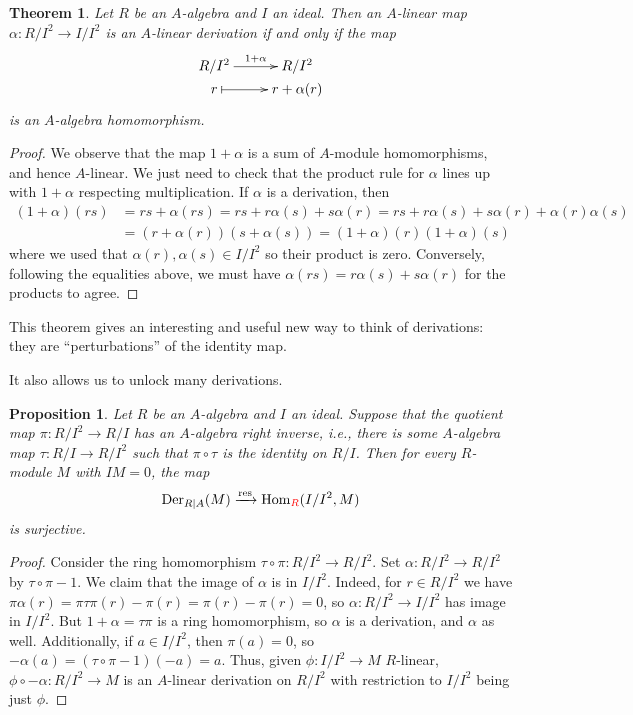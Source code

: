 \documentclass{amsart}[12pt]
\def\Der{\operatorname{Der}}
\newcommand{\Hom}{\mathrm{Hom}}
\numberwithin{equation}{section}
\theoremstyle{plain} %
\newtheorem{thm}[equation]{Theorem}
\newtheorem{prop}[equation]{Proposition}
\theoremstyle{definition}
\theoremstyle{remark}
\newcommand{\xra}[1]{\xrightarrow{#1}}
\def\res{\operatorname{res}}
\newcommand{\red}[1]{{\color{red}#1}}
\begin{document}
\begin{thm} Let $R$ be an $A$-algebra and $I$ an ideal. Then an $A$-linear map $\alpha: R/I^2 \to I/I^2$ is an $A$-linear derivation if and only if the map 
\[ \xymatrix@R=0pc{ R/I^2 \ar[r]^-{1+\alpha} &  R/I^2 \\ r \ar@{|->}[r]& r + \alpha(r) }\]
is an $A$-algebra homomorphism.
\end{thm}
\begin{proof}
We observe that the map $1+\alpha$ is a sum of $A$-module homomorphisms, and hence $A$-linear. We just need to check that the product rule for $\alpha$ lines up with $1+\alpha$ respecting multiplication. If $\alpha$ is a derivation, then
\[\begin{aligned} (1+\alpha)(rs) &= rs + \alpha(rs) =  rs + r \alpha(s) + s \alpha(r) = rs + r \alpha(s) + s \alpha(r) +\alpha(r)\alpha(s) \\&= (r+\alpha(r))(s+\alpha(s)) = (1+\alpha)(r) (1+\alpha)(s)\end{aligned}\]
where we used that $\alpha(r),\alpha(s)\in I/I^2$ so their product is zero. Conversely, following the equalities above, we must have $\alpha(rs)= r \alpha(s) + s \alpha(r)$ for the products to agree.
\end{proof}

This theorem gives an interesting and useful new way to think of derivations: they are ``perturbations''  of the identity map.

It also allows us to unlock many derivations.

\begin{prop} Let $R$ be an $A$-algebra and $I$ an ideal. Suppose that the quotient map $\pi :R/I^2 \to R/I$ has an $A$-algebra  right inverse, i.e., there is some $A$-algebra map $\tau:R/I \to R/I^2$ such that $\pi \circ \tau$ is the identity on $R/I$. Then for every $R$-module $M$ with $IM=0$, the map
\[ \Der_{R|A}(M) \xra{\res} \Hom_{\red{R}}(I/I^2,M)\]
is surjective.
\end{prop}
\begin{proof}
Consider the ring homomorphism $\tau \circ \pi : R/I^2 \to R/I^2$. Set $\alpha: R/I^2 \to R/I^2$ by $\tau \circ \pi-1$. We claim that the image of $\alpha$ is in $I/I^2$. Indeed, for $r\in R/I^2$ we have $\pi \alpha(r) = \pi \tau \pi(r) -\pi(r)= \pi(r)-\pi(r)=0$, so $\alpha: R/I^2 \to I/I^2$ has image in $I/I^2$. But $1+\alpha=\tau\pi$ is a ring homomorphism, so $\alpha$ is a derivation, and $\alpha$ as well. Additionally, if $a\in I/I^2$, then $\pi(a)=0$, so $-\alpha(a) = (\tau \circ \pi -1)(-a) = a$. Thus, given $\phi:I/I^2 \to M$ $R$-linear, $\phi\circ -\alpha:R/I^2 \to M$ is an $A$-linear derivation on $R/I^2$ with restriction to $I/I^2$ being just $\phi$.
\end{proof}
\end{document}
